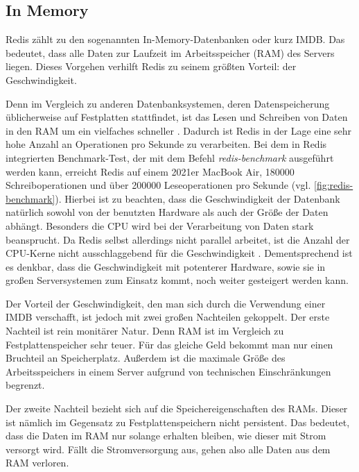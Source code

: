 
\subsection{In Memory}
\label{sec:inMemory}
Redis zählt zu den sogenannten In-Memory-Datenbanken oder kurz IMDB. 
Das bedeutet, dass alle Daten zur Laufzeit im Arbeitsspeicher (RAM) des Servers liegen.
Dieses Vorgehen verhilft Redis zu seinem größten Vorteil: der Geschwindigkeit.

Denn im Vergleich zu anderen Datenbanksystemen, deren Datenspeicherung üblicherweise auf Festplatten stattfindet, ist das Lesen und Schreiben von Daten in den RAM um ein vielfaches schneller \cite{VL_Rechnerarchitektur}.
Dadurch ist Redis in der Lage eine sehr hohe Anzahl an Operationen pro Sekunde zu verarbeiten.
Bei dem in Redis integrierten Benchmark-Test, der mit dem Befehl \textit{redis-benchmark} ausgeführt werden kann, erreicht Redis auf einem 2021er MacBook Air, 180000 Schreiboperationen und über 200000 Leseoperationen pro Sekunde (vgl. \autoref{fig:redis-benchmark}).
Hierbei ist zu beachten, dass die Geschwindigkeit der Datenbank natürlich sowohl von der benutzten Hardware als auch der Größe der Daten abhängt.
Besonders die CPU wird bei der Verarbeitung von Daten stark beansprucht. Da Redis selbst allerdings nicht parallel arbeitet, ist die Anzahl der CPU-Kerne nicht ausschlaggebend für die Geschwindigkeit \cite{Redis-Docs-Benchmarks}.
Dementsprechend ist es denkbar, dass die Geschwindigkeit mit potenterer Hardware, sowie sie in großen Serversystemen zum Einsatz kommt, noch weiter gesteigert werden kann.

Der Vorteil der Geschwindigkeit, den man sich durch die Verwendung einer IMDB verschafft, ist jedoch mit zwei großen Nachteilen gekoppelt.
Der erste Nachteil ist rein monitärer Natur. 
Denn RAM ist im Vergleich zu Festplattenspeicher sehr teuer. Für das gleiche Geld bekommt man nur einen Bruchteil an Speicherplatz.
Außerdem ist die maximale Größe des Arbeitsspeichers in einem Server aufgrund von technischen Einschränkungen begrenzt.

Der zweite Nachteil bezieht sich auf die Speichereigenschaften des RAMs.
Dieser ist nämlich im Gegensatz zu Festplattenspeichern nicht persistent.
Das bedeutet, dass die Daten im RAM nur solange erhalten bleiben, wie dieser mit Strom versorgt wird.
Fällt die Stromversorgung aus, gehen also alle Daten aus dem RAM verloren. 